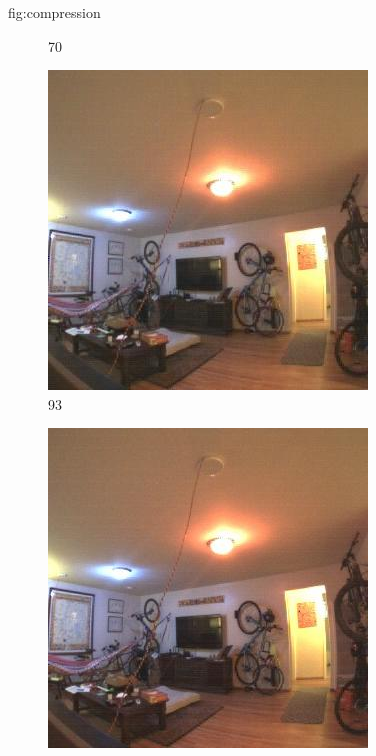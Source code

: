 \begin{definefigure}{fig:compression}
\begin{subfigure}{0.4\columnwidth}
\vspace{-1.5\baselineskip}
\caption{70}
\label{fig:70}
\end{subfigure}
\par\medskip
\begin{subfigure}{0.4\columnwidth}
\includegraphics[width=\linewidth]{figs/permacam/93.jpeg}
\vspace{-1.5\baselineskip}
\caption{93}
\label{fig:93}
\end{subfigure}
%
\begin{subfigure}{0.4\columnwidth}
\includegraphics[width=\linewidth]{figs/permacam/raw.jpeg}

\end{subfigure}
\end{definefigure}
